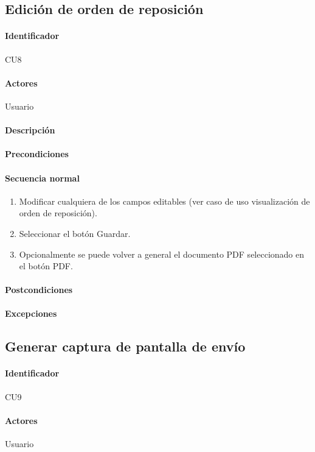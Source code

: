 \subsection{Edición de orden de reposición}
\paragraph{Identificador}
CU8
\paragraph{Actores}
Usuario
\paragraph{Descripción}
\paragraph{Precondiciones}
\paragraph{Secuencia normal}
\begin{enumerate}
\item Modificar cualquiera de los campos editables (ver caso de uso visualización de orden de reposición).
\item Seleccionar el botón Guardar.
\item Opcionalmente se puede volver a general el documento PDF seleccionado en el botón PDF.
\end{enumerate}
\paragraph{Postcondiciones}
\paragraph{Excepciones}


\subsection{Generar captura de pantalla de envío}
\paragraph{Identificador}
CU9
\paragraph{Actores}
Usuario
